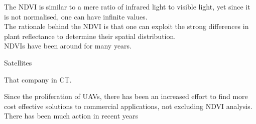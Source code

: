 The NDVI is similar to a mere ratio of infrared light to visible light, yet since it is not normalised, one can have infinite values.\\

The rationale behind the NDVI is that one can exploit the strong differences in plant reflectance to determine their spatial distribution.\\

NDVIs have been around for many years. 

Satellites

That company in CT.


Since the proliferation of UAVs, there has been an increased effort to find more cost effective solutions to commercial applications, not excluding NDVI analysis.
There has been much action in recent years 